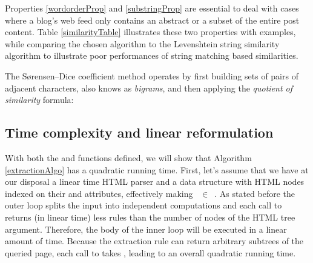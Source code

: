 Properties \ref{wordorderProp} and \ref{substringProp} are essential to deal with cases where a blog's web feed only contains an abstract or a subset of the entire post content. Table \ref{similarityTable} illustrates these two properties with examples, while comparing the chosen algorithm to the Levenshtein string similarity algorithm\cite{levenshtein1966} to illustrate poor performances of string matching based similarities.

\similarityTable

The Sørensen–Dice coefficient method operates by first building sets of pairs of adjacent characters, also knows as \emph{bigrams}, and then applying the \emph{quotient of similarity} formula:

\similarityAlgo

\subsection{Time complexity and linear reformulation}
With both the  and  functions defined, we will show that Algorithm \ref{extractionAlgo} has a quadratic running time. First, let's assume that we have at our disposal a linear time HTML parser and a data structure with HTML nodes indexed on their  and  attributes, effectively making ~$\in$~. As stated before the outer loop splits the input into independent computations and each call to  returns (in linear time) less rules than the number of nodes of the HTML tree argument. Therefore, the body of the inner loop will be executed in a linear amount of time. Because the extraction rule can return arbitrary subtrees of the queried page, each call to  takes , leading to an overall quadratic running time.

\linearAlgo

